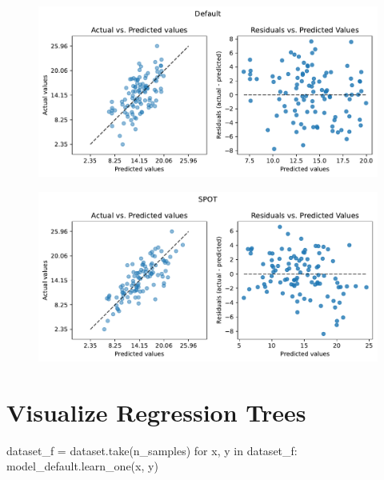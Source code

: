 \documentclass[
  letterpaper,
  DIV=11,
  numbers=noendperiod]{scrreprt}
\newenvironment{Shaded}{\begin{snugshade}}{\end{snugshade}}
\newcommand{\ControlFlowTok}[1]{\textcolor[rgb]{0.00,0.23,0.31}{#1}}
\newcommand{\KeywordTok}[1]{\textcolor[rgb]{0.00,0.23,0.31}{#1}}
\newcommand{\NormalTok}[1]{\textcolor[rgb]{0.00,0.23,0.31}{#1}}
\newcommand{\OperatorTok}[1]{\textcolor[rgb]{0.37,0.37,0.37}{#1}}
\begin{document}
\begin{figure}[H]

{\centering \includegraphics{024_spot_hpt_river_friedman_hatr_files/figure-pdf/cell-36-output-1.pdf}

}

\end{figure}

\begin{figure}[H]

{\centering \includegraphics{024_spot_hpt_river_friedman_hatr_files/figure-pdf/cell-36-output-2.pdf}

}

\end{figure}

\hypertarget{visualize-regression-trees}{%
\section{Visualize Regression Trees}\label{visualize-regression-trees}}

\begin{Shaded}
\begin{Highlighting}[]
\NormalTok{dataset\_f }\OperatorTok{=}\NormalTok{ dataset.take(n\_samples)}
\ControlFlowTok{for}\NormalTok{ x, y }\KeywordTok{in}\NormalTok{ dataset\_f:}
\NormalTok{    model\_default.learn\_one(x, y)}
\end{Highlighting}
\end{Shaded}
\end{document}
